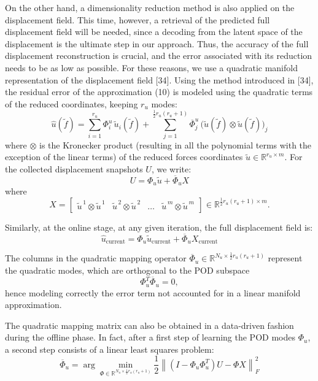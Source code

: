 \documentclass[11pt]{article}
\begin{document}
On the other hand, a dimensionality reduction method is also applied on the displacement field. This time, however, a retrieval of the predicted full displacement field will be needed, since a decoding from the latent space of the displacement is the ultimate step in our approach. Thus, the accuracy of the full displacement reconstruction is crucial, and the error associated with its reduction needs to be as low as possible. For these reasons, we use a quadratic manifold representation of the displacement field [34]. Using the method introduced in [34], the residual error of the approximation (10) is modeled using the quadratic terms of the reduced coordinates, keeping $r_u$ modes:
\begin{equation}
\tag{14}
\hat{u}(\tilde{f}) =
\sum_{i=1}^{r_u} \Phi_i^{u}\,\tilde{u}_i(\tilde{f})
+
\sum_{j=1}^{\frac{1}{2}r_u(r_u+1)}
\overline{\Phi}_j^{u}\,
\big(\tilde{u}(\tilde{f}) \otimes \tilde{u}(\tilde{f})\big)_j
\end{equation}
where $\otimes$ is the Kronecker product (resulting in all the polynomial terms with the exception of the linear terms) of the reduced forces coordinates $\tilde{u} \in \mathbb{R}^{r_u \times m}$. For the collected displacement snapshots $U$, we write:
\begin{equation}
\tag{15}
U = \Phi_u \tilde{u} + \overline{\Phi}_u X
\end{equation}
where
\[
X =
\begin{bmatrix}
\tilde{u}^{\,1} \otimes \tilde{u}^{\,1} &
\tilde{u}^{\,2} \otimes \tilde{u}^{\,2} &
\ldots &
\tilde{u}^{\,m} \otimes \tilde{u}^{\,m}
\end{bmatrix}
\in \mathbb{R}^{\frac{1}{2}r_u(r_u+1)\times m}.
\]

Similarly, at the online stage, at any given iteration, the full displacement field is:
\begin{equation}
\tag{16}
\hat{u}_{\mathrm{current}} = \Phi_u \tilde{u}_{\mathrm{current}} + \overline{\Phi}_u X_{\mathrm{current}}
\end{equation}

The columns in the quadratic mapping operator $\overline{\Phi}_u \in \mathbb{R}^{N_u \times \frac{1}{2}r_u(r_u+1)}$ represent the quadratic modes, which are orthogonal to the POD subspace
\[
\Phi_u^{T}\overline{\Phi}_u = 0,
\]
hence modeling correctly the error term not accounted for in a linear manifold approximation.

The quadratic mapping matrix can also be obtained in a data-driven fashion during the offline phase. In fact, after a first step of learning the POD modes $\Phi_u$, a second step consists of a linear least squares problem:
\begin{equation}
\tag{17}
\overline{\Phi}_u =
\arg\min_{\Phi \in \mathbb{R}^{N_u \times \frac{1}{2}r_u(r_u+1)}}
\frac{1}{2}
\left\|
(I - \Phi_u \Phi_u^{T})U - \Phi X
\right\|_{F}^{2}
\end{equation}
\end{document}
